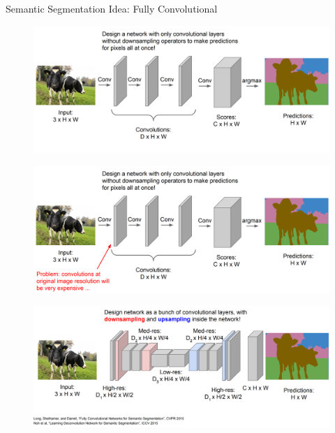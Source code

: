 \begin{frame}[allowframebreaks]{Semantic Segmentation Idea: Fully Convolutional}
\begin{figure}
\centering
\includegraphics[width=1.0\textwidth,height=1.0\textheight,keepaspectratio]{images/segmentation/sem_7.png}
\end{figure}

\framebreak

\begin{figure}
\centering
\includegraphics[width=1.0\textwidth,height=1.0\textheight,keepaspectratio]{images/segmentation/sem_8.png}
\end{figure}

\framebreak

\begin{figure}
\centering
\includegraphics[width=1.0\textwidth,height=1.0\textheight,keepaspectratio]{images/segmentation/sem_9.png}
\end{figure}


\end{frame}
